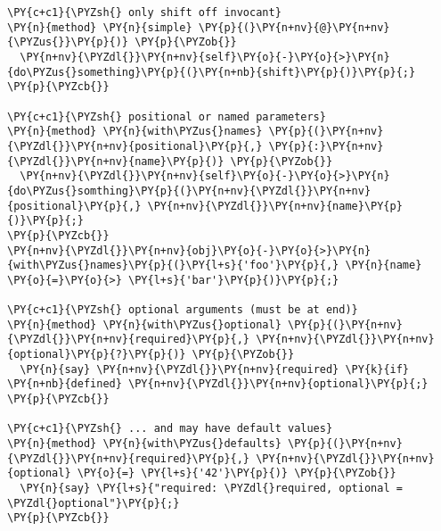 \begin{Verbatim}[commandchars=\\\{\}]
\PY{c+c1}{\PYZsh{} only shift off invocant}
\PY{n}{method} \PY{n}{simple} \PY{p}{(}\PY{n+nv}{@}\PY{n+nv}{\PYZus{}}\PY{p}{)} \PY{p}{\PYZob{}}
  \PY{n+nv}{\PYZdl{}}\PY{n+nv}{self}\PY{o}{-}\PY{o}{>}\PY{n}{do\PYZus{}something}\PY{p}{(}\PY{n+nb}{shift}\PY{p}{)}\PY{p}{;}
\PY{p}{\PYZcb{}}

\PY{c+c1}{\PYZsh{} positional or named parameters}
\PY{n}{method} \PY{n}{with\PYZus{}names} \PY{p}{(}\PY{n+nv}{\PYZdl{}}\PY{n+nv}{positional}\PY{p}{,} \PY{p}{:}\PY{n+nv}{\PYZdl{}}\PY{n+nv}{name}\PY{p}{)} \PY{p}{\PYZob{}}
  \PY{n+nv}{\PYZdl{}}\PY{n+nv}{self}\PY{o}{-}\PY{o}{>}\PY{n}{do\PYZus{}somthing}\PY{p}{(}\PY{n+nv}{\PYZdl{}}\PY{n+nv}{positional}\PY{p}{,} \PY{n+nv}{\PYZdl{}}\PY{n+nv}{name}\PY{p}{)}\PY{p}{;}
\PY{p}{\PYZcb{}}
\PY{n+nv}{\PYZdl{}}\PY{n+nv}{obj}\PY{o}{-}\PY{o}{>}\PY{n}{with\PYZus{}names}\PY{p}{(}\PY{l+s}{'foo'}\PY{p}{,} \PY{n}{name} \PY{o}{=}\PY{o}{>} \PY{l+s}{'bar'}\PY{p}{)}\PY{p}{;}

\PY{c+c1}{\PYZsh{} optional arguments (must be at end)}
\PY{n}{method} \PY{n}{with\PYZus{}optional} \PY{p}{(}\PY{n+nv}{\PYZdl{}}\PY{n+nv}{required}\PY{p}{,} \PY{n+nv}{\PYZdl{}}\PY{n+nv}{optional}\PY{p}{?}\PY{p}{)} \PY{p}{\PYZob{}}
  \PY{n}{say} \PY{n+nv}{\PYZdl{}}\PY{n+nv}{required} \PY{k}{if} \PY{n+nb}{defined} \PY{n+nv}{\PYZdl{}}\PY{n+nv}{optional}\PY{p}{;}
\PY{p}{\PYZcb{}}

\PY{c+c1}{\PYZsh{} ... and may have default values}
\PY{n}{method} \PY{n}{with\PYZus{}defaults} \PY{p}{(}\PY{n+nv}{\PYZdl{}}\PY{n+nv}{required}\PY{p}{,} \PY{n+nv}{\PYZdl{}}\PY{n+nv}{optional} \PY{o}{=} \PY{l+s}{'42'}\PY{p}{)} \PY{p}{\PYZob{}}
  \PY{n}{say} \PY{l+s}{"required: \PYZdl{}required, optional = \PYZdl{}optional"}\PY{p}{;} 
\PY{p}{\PYZcb{}}
\end{Verbatim}
